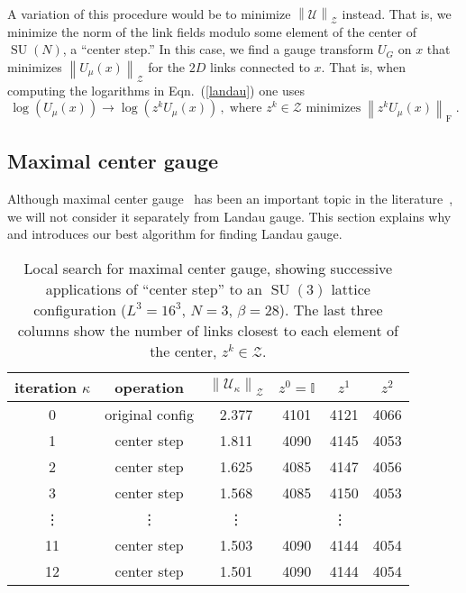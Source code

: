 \documentclass[preprint,aps,prd]{revtex4-2}
\newcommand{\be}{\begin{equation}}
\newcommand{\eq}{\end{equation}}
\newcommand{\zentrum}{\mathcal{Z}}       %
\newcommand{\config}{\mathcal{U}}
\DeclareMathOperator{\SU}{SU}
\newcommand\fnorm[1]{\left\lVert #1 \right\rVert_\mathrm{F}}
\begin{document}
A variation of this procedure would be to minimize
$\left\lVert \config \right\rVert_\zentrum$ instead.
That is, we minimize the norm of the link
fields modulo some element of the center of $\SU(N)$, a ``center step.''
In this case, we find a gauge transform $U_G$ on $x$
that minimizes $\left\lVert U_\mu(x) \right\rVert_\zentrum$ for the $2D$
links connected to $x$.
That is, when computing the logarithms in Eqn.~(\ref{landau}) one uses
\be
\log\left(U_\mu(x)\right) \to \log\left(z^k U_\mu(x)\right)
\, , \;\mbox{
  where $z^k\in\zentrum$ minimizes}\; \fnorm{z^k U_\mu(x)} \;.
\eq


\subsection{Maximal center gauge}

Although maximal center gauge~\cite{del_debbio_center_1997}
has been an important topic in the
literature~\cite{greensite_confinement_2003},
we will not consider it separately from Landau gauge.
This section explains why and introduces our best algorithm
for finding Landau gauge.

\begin{table}
  \caption{Local search for maximal center gauge,
    showing successive applications of ``center step'' to
    an $\SU(3)$ lattice configuration ($L^3=16^3$, $N=3$, $\beta=28$).
    The last three columns show the number of links closest
    to each element of the center, $z^k \in \zentrum$.
    \label{center1}}
  \begin{tabular}{c|c|c|ccc}
    iteration $\kappa$ & operation & $\left\lVert \config_\kappa \right\rVert_\zentrum$
     & $z^0=\mathbb{I}$ & $z^1$ & $z^2$ \\
    \hline
    0 & original config & 2.377 & 4101 & 4121 & 4066\\
    1 & center step     & 1.811 & 4090 & 4145 & 4053\\
    2 & center step     & 1.625 & 4085 & 4147 & 4056\\
    3 & center step     & 1.568 & 4085 & 4150 & 4053\\
    \vdots & \vdots & \vdots & \multicolumn{3}{c}{\vdots}\\
    11 & center step    & 1.503 & 4090 & 4144 & 4054\\
    12 & center step    & 1.501 & 4090 & 4144 & 4054\\
  \end{tabular}
\end{table}
\end{document}
